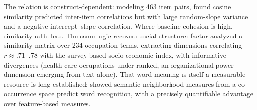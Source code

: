 The relation is construct-dependent: modeling 463 item pairs,
\citet{zhang-qiu-2026} found cosine similarity predicted inter-item correlations
but with large random-slope variance and a negative intercept--slope
correlation. Where baseline cohesion is high, similarity adds less. The same logic
recovers social structure:
\citet{kmetty-etal-2021} factor-analyzed a similarity matrix over 234 occupation
terms, extracting dimensions correlating $r\approx.71$--$.78$ with the survey-based
socio-economic index, with informative divergences (health-care occupations
under-ranked, an organizational-power dimension emerging from text alone). That word
meaning is itself a measurable resource is long established: \citet{buchanan-etal-2001}
showed semantic-neighborhood measures from a co-occurrence space predict word
recognition, with a precisely quantifiable advantage over feature-based
measures.
